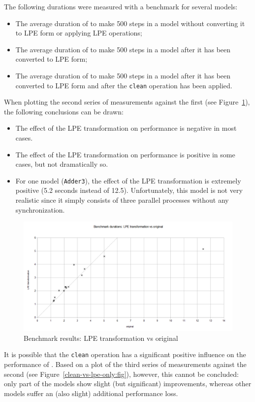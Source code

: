 The following durations were measured with a benchmark for several models:
\begin{itemize}
\item The average duration of \txs{} to make 500 steps in a model without converting it to LPE form or applying LPE operations;
\item The average duration of \txs{} to make 500 steps in a model after it has been converted to LPE form;
\item The average duration of \txs{} to make 500 steps in a model after it has been converted to LPE form and after the \texttt{clean} operation has been applied.
\end{itemize}

When plotting the second series of measurements against the first (see Figure~\ref{lpe-only-vs-original:fig}), the following conclusions can be drawn:
\begin{itemize}
\item The effect of the LPE transformation on performance is negative in most cases.
\item The effect of the LPE transformation on performance is positive in some cases, but not dramatically so.
\item For one model (\texttt{Adder3}), the effect of the LPE transformation is extremely positive (5.2 seconds instead of 12.5).
Unfortunately, this model is not very realistic since it simply consists of three parallel processes without any synchronization.
\end{itemize}

\begin{figure}[!ht]
\begin{center}
\includegraphics[width=0.8\linewidth]{charts/lpe-only-vs-original}
\caption{Benchmark results: LPE transformation vs original}
\label{lpe-only-vs-original:fig}
\end{center}
\end{figure}

It is possible that the \texttt{clean} operation has a significant positive influence on the performance of \txs{}.
Based on a plot of the third series of measurements against the second (see Figure~\ref{clean-vs-lpe-only:fig}), however, this cannot be concluded: only part of the models show slight (but significant) improvements, whereas other models suffer an (also slight) additional performance loss.

